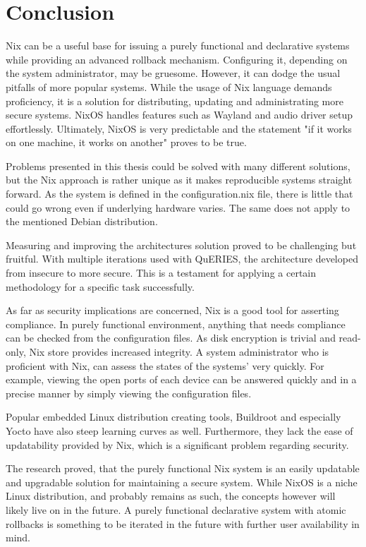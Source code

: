 \chapter{Conclusion} \label{conclusion}

Nix can be a useful base for issuing a purely functional and
declarative systems while providing an advanced rollback
mechanism. Configuring it, depending on the system administrator, may
be gruesome. However, it can dodge the usual pitfalls of more popular
systems. While the usage of Nix language demands proficiency, it is a
solution for distributing, updating and administrating more secure
systems. NixOS handles features such as Wayland and audio driver setup
effortlessly. Ultimately, NixOS is very predictable and the statement
"if it works on one machine, it works on another" proves to be true.

Problems presented in this thesis could be solved with many different solutions,
but the Nix approach is rather unique as it makes reproducible systems straight forward. As the system is defined in the
configuration.nix file, there is little that could go wrong even if 
underlying hardware varies. The same does not apply to the mentioned
Debian distribution.

Measuring and improving the architectures solution proved to be
challenging but fruitful. With multiple iterations used with QuERIES,
the architecture developed from insecure to more secure. This is a
testament for applying a certain methodology for a
specific task successfully.

As far as security implications are concerned, Nix is a good tool for
asserting compliance. In purely functional environment, anything that
needs compliance can be checked from the configuration files. As disk
encryption is trivial and read-only, Nix store provides increased
integrity. A system administrator who is proficient with Nix, can
assess the states of the systems' very quickly. For example, viewing
the open ports of each device can be answered quickly and in a precise
manner by simply viewing the configuration files.

Popular embedded Linux distribution creating tools,
Buildroot and especially Yocto have also steep learning curves as well. Furthermore, they
lack the ease of updatability provided by Nix, which is a
significant problem regarding security.

The research proved, that the purely functional Nix system is an
easily updatable and upgradable solution for maintaining a secure
system.  While NixOS is a niche Linux distribution, and probably
remains as such, the concepts however will likely live on in the
future. A purely functional declarative system with atomic rollbacks
is something to be iterated in the future with further user
availability in mind.
